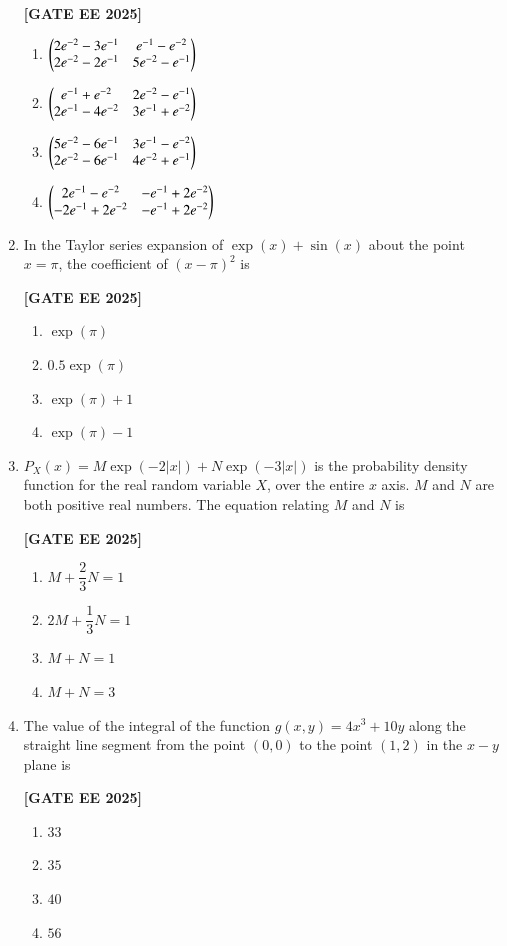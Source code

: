 \documentclass[12pt]{article}
\begin{document}
\begin{enumerate}[leftmargin=*, label=\textbf{Q.\arabic*:}]
\noindent \textbf{[GATE EE 2025]}
\begin{enumerate}
    \item $\begin{pmatrix} 2e^{-2} - 3e^{-1} & e^{-1} - e^{-2} \\ 2e^{-2} - 2e^{-1} & 5e^{-2} - e^{-1}\end{pmatrix}$
    \item $\begin{pmatrix} e^{-1} + e^{-2} & 2e^{-2} - e^{-1} \\ 2e^{-1} - 4e^{-2} & 3e^{-1} + e^{-2} \end{pmatrix}$
    \item $\begin{pmatrix} 5e^{-2} - 6e^{-1} & 3e^{-1} - e^{-2} \\ 2e^{-2} - 6e^{-1} & 4e^{-2} + e^{-1} \end{pmatrix}$
    \item $\begin{pmatrix} 2e^{-1} - e^{-2} & -e^{-1} + 2e^{-2} \\ -2e^{-1} + 2e^{-2} & -e^{-1} + 2e^{-2} \end{pmatrix}$
\end{enumerate}

\item In the Taylor series expansion of $\exp(x) + \sin(x)$ about the point $x = \pi$, the coefficient of $(x - \pi)^2$ is
 
\noindent \textbf{[GATE EE 2025]}
\begin{enumerate}
    \item $\exp(\pi)$
    \item $0.5 \exp(\pi)$
    \item $\exp(\pi) + 1$
    \item $\exp(\pi) - 1$
\end{enumerate}

\item $P_X(x) = M\exp(-2|x|) + N\exp(-3|x|)$ is the probability density function for the real random variable $X$, over the entire $x$ axis. $M$ and $N$ are both positive real numbers. The equation relating $M$ and $N$ is
 
\noindent \textbf{[GATE EE 2025]}
\begin{enumerate}
    \item $M + \dfrac{2}{3} N = 1$
    \item $2M + \dfrac{1}{3}N = 1$
    \item $M + N = 1$
    \item $M + N = 3$
\end{enumerate}

\item The value of the integral of the function $g(x, y) = 4x^3 + 10y$ along the straight line segment from the point $(0,0)$ to the point $(1,2)$ in the $x-y$ plane is
 
\noindent \textbf{[GATE EE 2025]}
\begin{enumerate}
    \item $33$
    \item $35$
    \item $40$
    \item $56$
\end{enumerate}


\end{enumerate}
\end{document}
